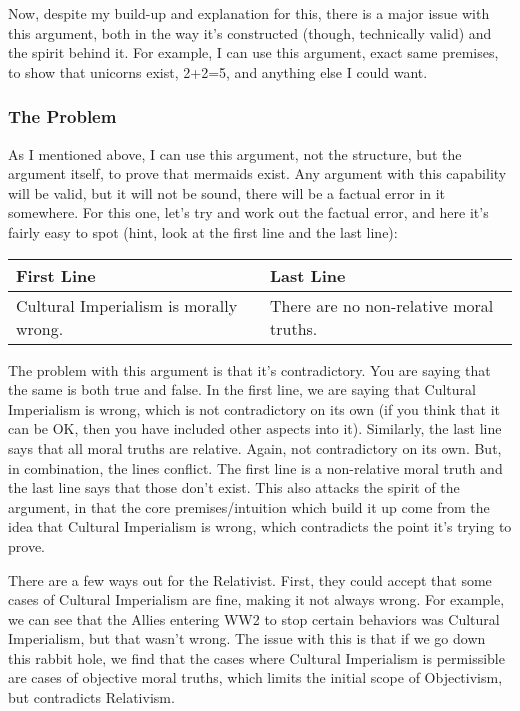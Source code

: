 Now, despite my build-up and explanation for this, there is a major issue with this argument, both in the way it's constructed (though, technically valid) and the spirit behind it. For example, I can use this argument, exact same premises, to show that unicorns exist, 2+2=5, and anything else I could want. 

\subsubsection{The Problem}

As I mentioned above, I can use this argument, not the structure, but the argument itself, to prove that mermaids exist. Any argument with this capability will be valid, but it will not be sound, there will be a factual error in it somewhere. For this one, let's try and work out the factual error, and here it's fairly easy to spot (hint, look at the first line and the last line):


\noindent
\begin{tabular}{p{2.75in}|p{2.75in}}
First Line&Last Line\\\hline
Cultural Imperialism is morally wrong.&There are no non-relative moral truths.
\end{tabular}

The problem with this argument is that it's contradictory. You are saying that the same is both true and false. In the first line, we are saying that Cultural Imperialism is wrong, which is not contradictory on its own (if you think that it can be OK, then you have included other aspects into it). Similarly, the last line says that all moral truths are relative. Again, not contradictory on its own. But, in combination, the lines conflict. The first line is a non-relative moral truth and the last line says that those don't exist. This also attacks the spirit of the argument, in that the core premises/intuition which build it up come from the idea that Cultural Imperialism is wrong, which contradicts the point it's trying to prove. 

There are a few ways out for the Relativist. First, they could accept that some cases of Cultural Imperialism are fine, making it not always wrong. For example, we can see that the Allies entering WW2 to stop certain behaviors was Cultural Imperialism, but that wasn't wrong. The issue with this is that if we go down this rabbit hole, we find that the cases where Cultural Imperialism is permissible are cases of objective moral truths, which limits the initial scope of Objectivism, but contradicts Relativism. 

